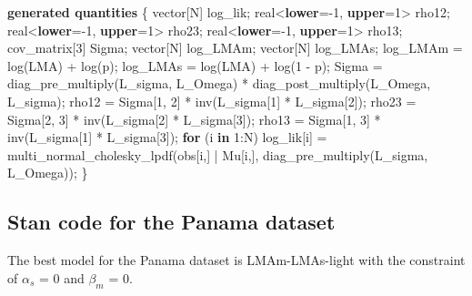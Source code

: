 \documentclass[
  12pt,
  letterpaper,
  DIV=11,
  numbers=noendperiod]{scrartcl}
\newenvironment{Shaded}{\begin{snugshade}}{\end{snugshade}}
\newcommand{\ControlFlowTok}[1]{\textcolor[rgb]{0.00,0.23,0.31}{\textbf{#1}}}
\newcommand{\DataTypeTok}[1]{\textcolor[rgb]{0.68,0.00,0.00}{#1}}
\newcommand{\DecValTok}[1]{\textcolor[rgb]{0.68,0.00,0.00}{#1}}
\newcommand{\KeywordTok}[1]{\textcolor[rgb]{0.00,0.23,0.31}{\textbf{#1}}}
\newcommand{\NormalTok}[1]{\textcolor[rgb]{0.00,0.23,0.31}{#1}}
\numberwithin{equation}{section}
\begin{document}
\begin{Shaded}
\begin{Highlighting}[]
\KeywordTok{generated quantities}\NormalTok{ \{}
  \DataTypeTok{vector}\NormalTok{[N] log\_lik;}
  \DataTypeTok{real}\NormalTok{\textless{}}\KeywordTok{lower}\NormalTok{={-}}\DecValTok{1}\NormalTok{, }\KeywordTok{upper}\NormalTok{=}\DecValTok{1}\NormalTok{\textgreater{} rho12;}
  \DataTypeTok{real}\NormalTok{\textless{}}\KeywordTok{lower}\NormalTok{={-}}\DecValTok{1}\NormalTok{, }\KeywordTok{upper}\NormalTok{=}\DecValTok{1}\NormalTok{\textgreater{} rho23;}
  \DataTypeTok{real}\NormalTok{\textless{}}\KeywordTok{lower}\NormalTok{={-}}\DecValTok{1}\NormalTok{, }\KeywordTok{upper}\NormalTok{=}\DecValTok{1}\NormalTok{\textgreater{} rho13;}
  \DataTypeTok{cov\_matrix}\NormalTok{[}\DecValTok{3}\NormalTok{] Sigma;}
  \DataTypeTok{vector}\NormalTok{[N] log\_LMAm;}
  \DataTypeTok{vector}\NormalTok{[N] log\_LMAs;}
\NormalTok{  log\_LMAm = log(LMA) + log(p);}
\NormalTok{  log\_LMAs = log(LMA) + log(}\DecValTok{1}\NormalTok{ {-} p);}
\NormalTok{  Sigma = diag\_pre\_multiply(L\_sigma, L\_Omega)}
\NormalTok{     * diag\_post\_multiply(L\_Omega\textquotesingle{}, L\_sigma);}
\NormalTok{  rho12 = Sigma[}\DecValTok{1}\NormalTok{, }\DecValTok{2}\NormalTok{] * inv(L\_sigma[}\DecValTok{1}\NormalTok{] * L\_sigma[}\DecValTok{2}\NormalTok{]);}
\NormalTok{  rho23 = Sigma[}\DecValTok{2}\NormalTok{, }\DecValTok{3}\NormalTok{] * inv(L\_sigma[}\DecValTok{2}\NormalTok{] * L\_sigma[}\DecValTok{3}\NormalTok{]);}
\NormalTok{  rho13 = Sigma[}\DecValTok{1}\NormalTok{, }\DecValTok{3}\NormalTok{] * inv(L\_sigma[}\DecValTok{1}\NormalTok{] * L\_sigma[}\DecValTok{3}\NormalTok{]);}
  \ControlFlowTok{for}\NormalTok{ (i }\ControlFlowTok{in} \DecValTok{1}\NormalTok{:N)}
\NormalTok{   log\_lik[i] = multi\_normal\_cholesky\_lpdf(obs[i,] | Mu[i,], diag\_pre\_multiply(L\_sigma, L\_Omega));}
\NormalTok{ \}}
\end{Highlighting}
\end{Shaded}

\subsection{Stan code for the Panama
dataset}\label{stan-code-for-the-panama-dataset}

The best model for the Panama dataset is LMAm-LMAs-light with the
constraint of \(\alpha_s\) = 0 and \(\beta_m\) = 0.
\end{document}
